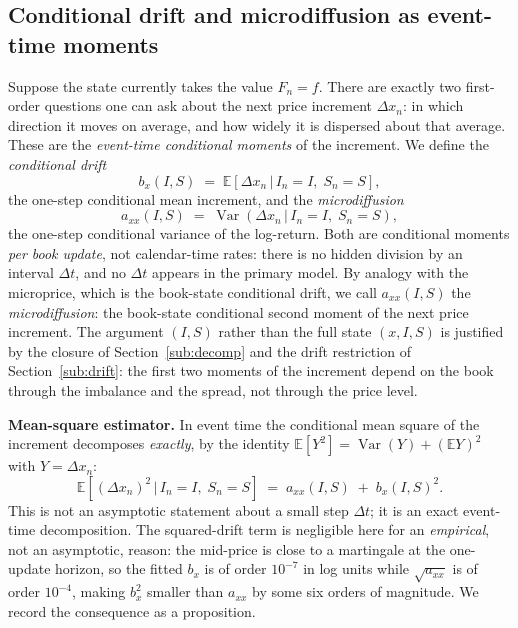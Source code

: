 \documentclass[11pt]{article}
\theoremstyle{plain}
\theoremstyle{definition}
\newcommand{\E}{\mathbb{E}}
\newcommand{\Var}{\operatorname{Var}}
\newcommand{\given}{\,\vert\,}
\newcommand{\axx}{a_{xx}}
\begin{document}
\subsection{Conditional drift and microdiffusion as event-time moments}
\label{sub:moments}

Suppose the state currently takes the value $F_n=f$. There are exactly two
first-order questions one can ask about the next price increment $\Delta x_n$: in which
direction it moves on average, and how widely it is dispersed about that average.
These are the \emph{event-time conditional moments} of the increment. We define the
\emph{conditional drift}
\begin{equation}
  b_x(I,S) \;=\; \E\!\left[\Delta x_n \given I_n=I,\; S_n=S\right],
  \label{eq:drift}
\end{equation}
the one-step conditional mean increment, and the \emph{microdiffusion}
\begin{equation}
  \axx(I,S) \;=\; \Var\!\left(\Delta x_n \given I_n=I,\; S_n=S\right),
  \label{eq:axx-def}
\end{equation}
the one-step conditional variance of the log-return. Both are conditional moments
\emph{per book update}, not calendar-time rates: there is no hidden division by an
interval $\Delta t$, and no $\Delta t$ appears in the primary model. By analogy with
the microprice, which is the book-state conditional drift, we call $\axx(I,S)$ the
\emph{microdiffusion}: the book-state conditional second moment of the next price
increment. The argument $(I,S)$ rather than the full state $(x,I,S)$ is justified
by the closure of Section~\ref{sub:decomp} and the drift restriction of
Section~\ref{sub:drift}: the first two moments of the increment depend on the book
through the imbalance and the spread, not through the price level.

\textbf{Mean-square estimator.} In event time the conditional mean square of the
increment decomposes \emph{exactly}, by the identity $\E[Y^2]=\Var(Y)+(\E Y)^2$ with
$Y=\Delta x_n$:
\begin{equation}
  \E\!\left[(\Delta x_n)^2 \given I_n=I,\; S_n=S\right]
  \;=\; \axx(I,S) \;+\; b_x(I,S)^2 .
  \label{eq:msq}
\end{equation}
This is not an asymptotic statement about a small step $\Delta t$; it is an exact
event-time decomposition. The squared-drift term is negligible here for an
\emph{empirical}, not an asymptotic, reason: the mid-price is close to a martingale at
the one-update horizon, so the fitted $b_x$ is of order $10^{-7}$ in log units while
$\sqrt{\axx}$ is of order $10^{-4}$, making $b_x^2$ smaller than $\axx$ by some six
orders of magnitude. We record the consequence as a proposition.
\end{document}
